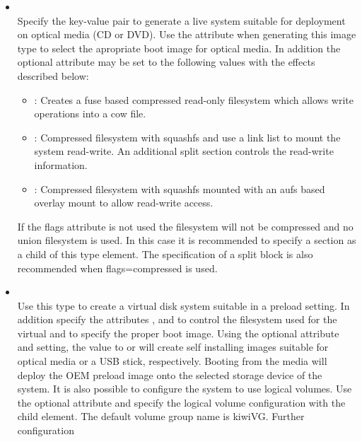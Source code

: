 \begin{itemize}
\item {}\\
      Specify the key-value pair  to generate a live system suitable
      for deployment on optical media (CD or DVD). Use the 
       attribute when generating this image
      type to select the apropriate boot image for optical media. In 
      addition the optional  attribute may be set to the
      following values with the effects described below:
      \begin{itemize}
      \item {}: Creates a fuse based compressed read-only
            filesystem which allows write operations into a cow file.
      \item {}: Compressed filesystem with squashfs and
            use a link list to mount the system read-write. An additional
            split section controls the read-write information.
      \item {}: Compressed filesystem with squashfs mounted
            with an aufs based overlay mount to allow read-write access.
      \end{itemize}
      If the flags attribute is not used the filesystem will not be compressed
      and no union filesystem is used. In this case it is recommended to
      specify a  section as a child of this type element. The
      specification of a split block is also recommended when flags=compressed
      is used.
\item {}\\
      Use this type to create a virtual disk system suitable in a preload
      setting. In addition specify the attributes , 
      and  to control the filesystem used
      for the virtual and to specify the proper boot image. Using the optional
       attribute and setting, the value to  or 
       will create self installing images suitable for optical media
      or a USB stick, respectively. Booting from the media will deploy
      the OEM preload image onto the selected storage device of the
      system. It is also possible to configure the system to use logical
      volumes. Use the optional  attribute and specify the
      logical volume configuration with the  child
      element. The default volume group name is kiwiVG. Further configuration

\end{itemize}
